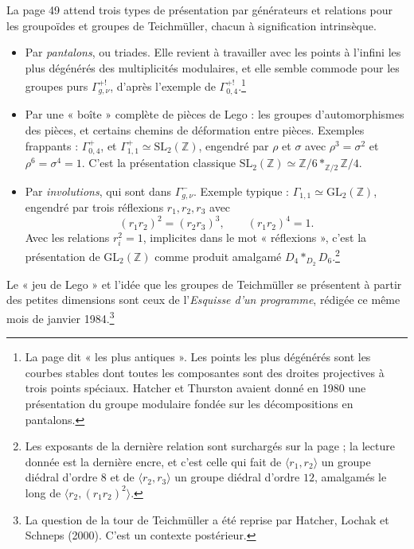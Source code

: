 \documentclass[11pt,a4paper]{article}
\begin{document}
La page 49 attend trois types de présentation par générateurs et relations
pour les groupoïdes et groupes de Teichmüller, chacun à signification
intrinsèque.

\begin{itemize}
  \item[a)] Par \emph{pantalons}, ou triades. Elle revient à travailler avec
  les points à l'infini les plus dégénérés des multiplicités modulaires, et
  elle semble commode pour les groupes purs $\Gamma^{+!}_{g,\nu}$, d'après
  l'exemple de $\Gamma^{+!}_{0,4}$.\footnote{La page dit « les plus
  antiques ». Les points les plus dégénérés sont les courbes stables dont
  toutes les composantes sont des droites projectives à trois points spéciaux.
  Hatcher et Thurston avaient donné en 1980 une présentation du groupe
  modulaire fondée sur les décompositions en pantalons.}
  \item[b)] Par une « boîte » complète de pièces de Lego : les groupes
  d'automorphismes des pièces, et certains chemins de déformation entre
  pièces. Exemples frappants : $\Gamma^{+}_{0,4}$, et
  $\Gamma^{+}_{1,1} \simeq \mathrm{SL}_2(\mathbb{Z})$, engendré par $\rho$ et
  $\sigma$ avec $\rho^{3} = \sigma^{2}$ et $\rho^{6} = \sigma^{4} = 1$. C'est
  la présentation classique $\mathrm{SL}_2(\mathbb{Z}) \simeq \mathbb{Z}/6
  *_{\mathbb{Z}/2} \mathbb{Z}/4$.
  \item[c)] Par \emph{involutions}, qui sont dans $\Gamma^{-}_{g,\nu}$.
  Exemple typique : $\Gamma_{1,1} \simeq \mathrm{GL}_2(\mathbb{Z})$, engendré
  par trois réflexions $r_1, r_2, r_3$ avec
  \[
  (r_1r_2)^{2} = (r_2r_3)^{3}, \qquad (r_1r_2)^{4} = 1 .
  \]
  Avec les relations $r_i^{2} = 1$, implicites dans le mot « réflexions »,
  c'est la présentation de $\mathrm{GL}_2(\mathbb{Z})$ comme produit amalgamé
  $D_4 *_{D_2} D_6$.\footnote{Les exposants de la dernière relation sont
  surchargés sur la page ; la lecture donnée est la dernière encre, et c'est
  celle qui fait de $\langle r_1,r_2\rangle$ un groupe diédral d'ordre $8$ et
  de $\langle r_2,r_3\rangle$ un groupe diédral d'ordre $12$, amalgamés le
  long de $\langle r_2, (r_1r_2)^{2}\rangle$.}
\end{itemize}

Le « jeu de Lego » et l'idée que les groupes de Teichmüller se présentent à
partir des petites dimensions sont ceux de l'\emph{Esquisse d'un programme},
rédigée ce même mois de janvier 1984.\footnote{La question de la tour de
Teichmüller a été reprise par Hatcher, Lochak et Schneps (2000). C'est un
contexte postérieur.}
\end{document}
